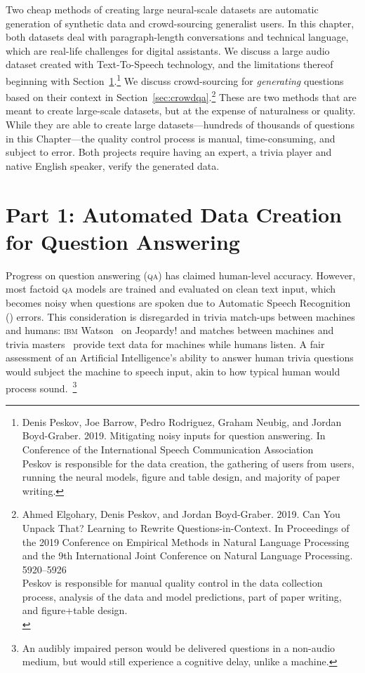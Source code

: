 
Two cheap methods of creating large neural-scale datasets are  automatic generation of synthetic data and crowd-sourcing generalist users.
%
In this chapter, both datasets deal with paragraph-length conversations and technical language, which are real-life challenges for digital assistants. 
%
We discuss a large audio dataset created with Text-To-Speech technology, and the limitations thereof beginning with Section~\ref{sec:auto}.\footnote{Denis Peskov, Joe Barrow, Pedro Rodriguez, Graham Neubig, and Jordan Boyd-Graber. 2019. Mitigating noisy inputs for question answering. In Conference of the International Speech Communication Association \\ Peskov is responsible for the data creation, the gathering of users from users, running the neural models, figure and table design, and majority of paper writing.} 
%
We discuss crowd-sourcing for \textit{generating} questions based on their context in Section~\ref{sec:crowdqa}.\footnote{Ahmed Elgohary, Denis Peskov, and Jordan Boyd-Graber. 2019.  Can You Unpack That? Learning to Rewrite Questions-in-Context. In Proceedings of the 2019 Conference on Empirical Methods in Natural Language Processing and the 9th International Joint Conference on Natural Language Processing. 5920–5926 \\
	Peskov is responsible for manual quality control in the data collection process, analysis of the data and model predictions, part of paper writing, and figure+table design. \\ }
%
These are two methods that are meant to create large-scale datasets, but at the expense of naturalness or quality.  
%
While they are able to create large datasets---hundreds of thousands of questions in this Chapter---the quality control process is manual, time-consuming, and subject to error.  
%
Both projects require having an expert, a trivia player and native English speaker, verify the generated data. 

\section{Part 1: Automated Data Creation for Question Answering}
\label{sec:auto}

Progress on question answering (\textsc{qa}) has claimed
 human-level accuracy.  However, most factoid \textsc{qa}
models are trained and evaluated on clean text input, which becomes
noisy when questions are spoken due to Automatic Speech Recognition
(\asr{}) errors.
%
This consideration is disregarded in trivia match-ups between machines
and humans: \textsc{ibm} Watson~\citep{Ferrucci10watson} on Jeopardy!
and \qb{} matches between machines and trivia
masters~\citep{Boyd-Graber:Feng:Rodriguez-2018} provide text data for
machines while humans listen.  
%
A fair assessment of an Artificial Intelligence's ability to answer human trivia questions would subject the machine to speech input, akin to how typical human would process sound.~\footnote{An audibly impaired person would be delivered questions in a non-audio medium, but would still experience a cognitive delay, unlike a machine.}

